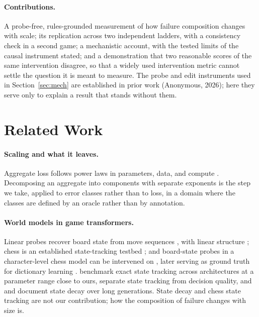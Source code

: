 \documentclass[11pt]{article}
\newcommand{\priorp}{(Anonymous, 2026)}
\begin{document}
\paragraph{Contributions.}
A probe-free, rules-grounded measurement of how failure composition changes with
scale; its replication across two independent ladders, with a consistency check in a
second game; a mechanistic account,
with the tested limits of the causal instrument stated; and a demonstration
that two reasonable scores of the same intervention disagree, so that a widely used
intervention metric cannot settle the question it is
meant to measure. The probe and edit instruments used in Section~\ref{sec:mech}
are established in prior work \priorp; here they serve only to
explain a result that stands without them.

\section{Related Work}

\paragraph{Scaling and what it leaves.}
Aggregate loss follows power laws in parameters, data, and compute
\citep{kaplan2020scaling,hoffmann2022training}. Decomposing an aggregate into
components with separate exponents is the step we take, applied to error classes
rather than to loss, in a domain where the classes are defined by an oracle
rather than by annotation.

\paragraph{World models in game transformers.}
Linear probes recover board state from move sequences \citep{li2023emergent},
with linear structure \citep{nanda2023emergent}; chess is an established
state-tracking testbed \citep{toshniwal2022chess}; and board-state probes in a
character-level chess model can be intervened on \citep{karvonen2024emergent},
later serving as ground truth for dictionary learning \citep{karvonen2024measuring}.
\citet{walker2026chess} benchmark exact state tracking across architectures at a
parameter range close to ours, \citet{li2026tracking} separate state tracking from
decision quality, and \citet{pereira2026transformers} and
\citet{harang2025tracking} document state decay over long generations. State
decay and chess state tracking are not our contribution; how the composition of
failure changes with size is.
\end{document}
